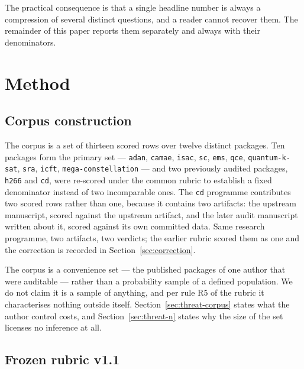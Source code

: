 \documentclass[sigconf,review]{acmart}
\newcommand{\pkg}[1]{\texttt{#1}}
\begin{document}
The practical consequence is that a single headline number is always a
compression of several distinct questions, and a reader cannot recover them.
The remainder of this paper reports them separately and always with their
denominators.

\section{Method}
\label{sec:method}

\subsection{Corpus construction}
\label{sec:method-corpus}

The corpus is a set of thirteen scored rows over twelve distinct packages. Ten
packages form the primary set --- \pkg{adan}, \pkg{camae}, \pkg{isac},
\pkg{sc}, \pkg{ems}, \pkg{qce}, \pkg{quantum-k-sat}, \pkg{sra}, \pkg{icft},
\pkg{mega-constellation} --- and two previously audited packages,
\pkg{h266} and \pkg{cd}, were re-scored under the common rubric to establish a
fixed denominator instead of two incomparable ones. The \pkg{cd} programme
contributes two scored rows rather than one, because it contains two
artifacts: the upstream manuscript, scored against the upstream artifact, and
the later audit manuscript written about it, scored against its own committed
data. Same research programme, two artifacts, two verdicts; the earlier rubric
scored them as one and the correction is recorded in Section~\ref{sec:correction}.

The corpus is a convenience set --- the published packages of one author that
were auditable --- rather than a probability sample of a defined population.
We do not claim it is a sample of anything, and per rule R5 of the rubric it
characterises nothing outside itself. Section~\ref{sec:threat-corpus} states
what the author control costs, and Section~\ref{sec:threat-n} states why the
size of the set licenses no inference at all.

\subsection{Frozen rubric v1.1}
\label{sec:method-rubric}
\end{document}
